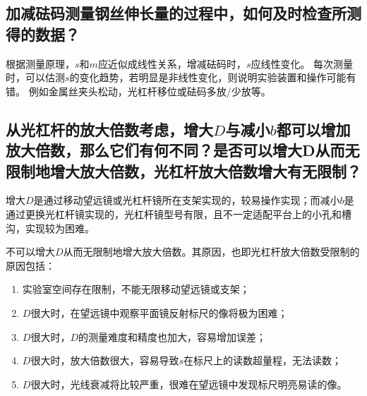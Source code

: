 \documentclass[]{../template/Report}%
\begin{document}
\begin{fullreportonly}
\subsection{加减砝码测量钢丝伸长量的过程中，如何及时检查所测得的数据？}

根据测量原理，$s$和$m$应近似成线性关系，增减砝码时，$s$应线性变化。
每次测量时，可以估测$s$的变化趋势，若明显是非线性变化，则说明实验装置和操作可能有错。
例如金属丝夹头松动，光杠杆移位或砝码多放/少放等。

\subsection{从光杠杆的放大倍数考虑，增大$D$与减小$b$都可以增加放大倍数，那么它们有何不同？是否可以增大D从而无限制地增大放大倍数，光杠杆放大倍数增大有无限制？}
增大$D$是通过移动望远镜或光杠杆镜所在支架实现的，较易操作实现；而减小$b$是通过更换光杠杆镜实现的，光杠杆镜型号有限，且不一定适配平台上的小孔和槽沟，实现较为困难。

不可以增大$D$从而无限制地增大放大倍数。其原因，也即光杠杆放大倍数受限制的原因包括：
\begin{enumerate}
    \item 实验室空间存在限制，不能无限移动望远镜或支架；
    \item $D$很大时，在望远镜中观察平面镜反射标尺的像将极为困难；
    \item $D$很大时，$D$的测量难度和精度也加大，容易增加误差；
    \item $D$很大时，放大倍数很大，容易导致$s$在标尺上的读数超量程，无法读数；
    \item $D$很大时，光线衰减将比较严重，很难在望远镜中发现标尺明亮易读的像。
\end{enumerate}

\end{fullreportonly}
\insertnotes
\end{document}

